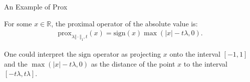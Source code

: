 \documentclass[11pt]{beamer}
\begin{document}
        \begin{frame}{An Example of Prox}
            \begin{definition}
                For some $x \in \mathbb R$, the proximal operator of the absolute value is:
                \begin{align*}
                   \text{prox}_{\lambda \Vert\cdot \Vert_1, t}(x) = \text{sign}(x)\max(|x| - t\lambda , 0). 
                \end{align*}
            \end{definition}
            One could interpret the $\text{sign}$ operator as projecting $x$ onto the interval $[-1, 1]$ and the $\max(|x| - t\lambda , 0)$ as the distance of the point $x$ to the interval $[-t\lambda, t\lambda]$. 
        \end{frame}
        
\end{document}
